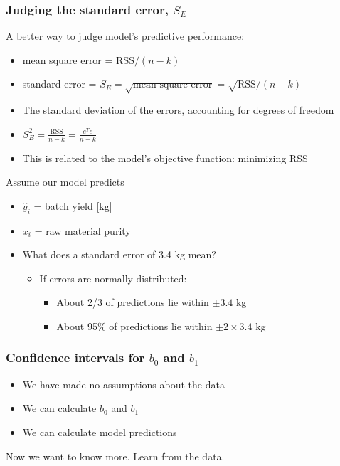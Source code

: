 \begin{frame}\frametitle{Judging the standard error, $S_E$}
	
	A better way to judge model's predictive performance: 
	\begin{itemize}
		\item	mean square error = $\text{RSS}/(n-k)$ 
		\item	standard error = $S_E = \sqrt{\text{mean square error}} = \sqrt{\text{RSS}/(n-k)}$ 
		\item	The standard deviation of the errors, accounting for degrees of freedom 
		\item	$S_E^2 = \frac{\displaystyle \text{RSS}}{\displaystyle n-k} = \frac{e^Te}{\displaystyle n-k}$ 
		\item	This is related to the model's objective function: minimizing RSS 
	\end{itemize}
	
	Assume our model predicts 
	\begin{itemize}
		\item	$\hat{y}_i$ = batch yield [kg] 
		\item	$x_i$ = raw material purity		
		\item	What does a standard error of 3.4 kg mean? 
		\begin{itemize}
			\item	If errors are normally distributed: 
			\begin{itemize}
				\item	About 2/3 of predictions lie within $\pm 3.4$ kg 
				\item	About 95\% of predictions lie within $\pm 2 \times 3.4$ kg 
			\end{itemize}
		\end{itemize}
	\end{itemize}
\end{frame}

\begin{frame}\frametitle{Confidence intervals for $b_0$ and $b_1$}
	\begin{itemize}
		\item	We have made no assumptions about the data 
		\item	We can calculate $b_0$ and $b_1$ 
		\item	We can calculate model predictions 
	\end{itemize}
	
	Now we want to know more. Learn from the data.
\end{frame}

